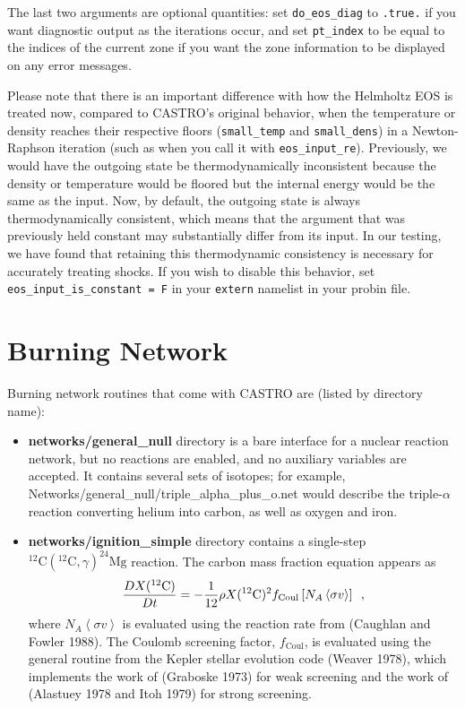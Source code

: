 The last two arguments are optional quantities: set \texttt{do\_eos\_diag} to \texttt{.true.} if you want diagnostic output as the iterations occur, and set \texttt{pt\_index} to be equal to the indices of the current zone if you want the zone information to be displayed on any error messages.

Please note that there is an important difference with how the Helmholtz EOS is treated now, compared to CASTRO's original behavior, when the temperature or density reaches their respective floors (\texttt{small\_temp} and \texttt{small\_dens}) in a Newton-Raphson iteration (such as when you call it with \texttt{eos\_input\_re}). Previously, we would have the outgoing state be thermodynamically inconsistent because the density or temperature would be floored but the internal energy would be the same as the input. Now, by default, the outgoing state is always thermodynamically consistent, which means that the argument that was previously held constant may substantially differ from its input. In our testing, we have found that retaining this thermodynamic consistency is necessary for accurately treating shocks. If you wish to disable this behavior, set \texttt{eos\_input\_is\_constant = F} in your \texttt{extern} namelist in your probin file.

\section{Burning Network}
Burning network routines that come with CASTRO are (listed by directory name):
\begin{itemize}
\item {\bf networks/general\_null} directory is a bare interface for a nuclear reaction network, but no reactions are enabled, and no auxiliary variables are accepted. It contains several sets of isotopes; for example, Networks/general\_null/triple\_alpha\_plus\_o.net would describe the triple-$\alpha$ reaction converting helium into carbon, as well as oxygen and iron.
\item {\bf networks/ignition\_simple} directory contains a single-step
$^{12}\mathrm{C}(^{12}\mathrm{C},\gamma)^{24}\mathrm{Mg}$ reaction.
The carbon mass fraction equation appears as
\begin{equation}
\frac{D X(^{12}\mathrm{C})}{Dt} = - \frac{1}{12} \rho X(^{12}\mathrm{C})^2
    f_\mathrm{Coul} \left [N_A \left <\sigma v \right > \right]\enskip,
\end{equation}
where $N_A \left <\sigma v\right>$ is evaluated using the reaction
rate from (Caughlan and Fowler 1988).  The Coulomb screening factor,
$f_\mathrm{Coul}$, is evaluated using the general routine from the
Kepler stellar evolution code (Weaver 1978), which implements
the work of (Graboske 1973) for weak screening and the work of
(Alastuey 1978 and Itoh 1979) for strong screening.
\end{itemize}

